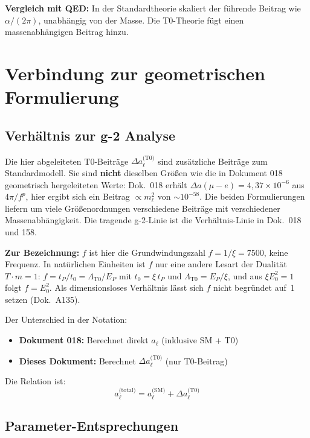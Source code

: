 	\textbf{Vergleich mit QED:} In der Standardtheorie skaliert der führende Beitrag wie $\alpha/(2\pi)$, unabhängig von der Masse. Die T0-Theorie fügt einen massenabhängigen Beitrag hinzu.
	
	\section{Verbindung zur geometrischen Formulierung}
	
	\subsection{Verhältnis zur g-2 Analyse}
	
	Die hier abgeleiteten T0-Beiträge $\Delta a_\ell^{\text{(T0)}}$ sind zusätzliche Beiträge zum Standardmodell. Sie sind \textbf{nicht} dieselben Größen wie die in Dokument 018 geometrisch hergeleiteten Werte: Dok.~018 erhält $\Delta a(\mu{-}e) = 4{,}37 \times 10^{-6}$ aus $4\pi/f^{p}$, hier ergibt sich ein Beitrag $\propto m_\ell^2$ von $\sim 10^{-58}$. Die beiden Formulierungen liefern um viele Größenordnungen verschiedene Beiträge mit verschiedener Massenabhängigkeit. Die tragende g-2-Linie ist die Verhältnis-Linie in Dok.~018 und 158.

	\textbf{Zur Bezeichnung:} $f$ ist hier die Grundwindungszahl $f = 1/\xi = 7500$, keine Frequenz. In natürlichen Einheiten ist $f$ nur eine andere Lesart der Dualität $T\cdot m = 1$: $f = t_P/t_0 = \Lambda_{\text{T0}}/E_P$ mit $t_0 = \xi\,t_P$ und $\Lambda_{\text{T0}} = E_P/\xi$, und aus $\xi E_0^2 = 1$ folgt $f = E_0^2$. Als dimensionsloses Verhältnis lässt sich $f$ nicht begründet auf~1 setzen (Dok.~A135).

	Der Unterschied in der Notation:
	\begin{itemize}
		\item \textbf{Dokument 018:} Berechnet direkt $a_\ell$ (inklusive SM + T0)
		\item \textbf{Dieses Dokument:} Berechnet $\Delta a_\ell^{\text{(T0)}}$ (nur T0-Beitrag)
	\end{itemize}
	
	Die Relation ist:
	\begin{equation}
		a_\ell^{\text{(total)}} = a_\ell^{\text{(SM)}} + \Delta a_\ell^{\text{(T0)}}
		\label{eq:total_relation}
	\end{equation}
	
	\subsection{Parameter-Entsprechungen}
	
